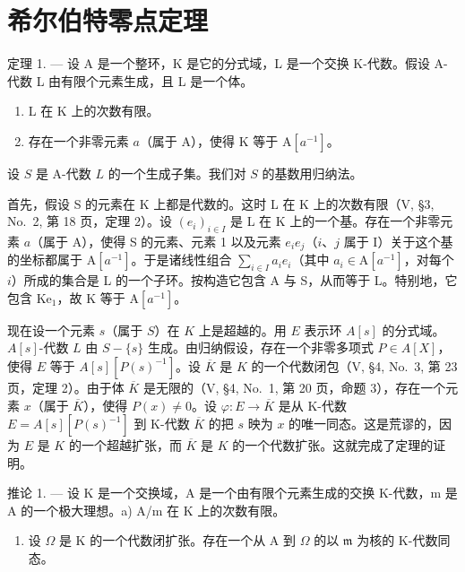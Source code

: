 \chapter{希尔伯特零点定理}

定理 1. --- 设 A 是一个整环，K 是它的分式域，L 是一个交换 K-代数。假设 A-代数 L 由有限个元素生成，且 L 是一个体。

\begin{enumerate}
\def\labelenumi{\alph{enumi})}
\item
  L 在 K 上的次数有限。
\item
  存在一个非零元素 \(a\)（属于 \(\mathrm{A}\)），使得 \(\mathrm{K}\) 等于 \(\mathrm{A}[a^{-1}]\)。
\end{enumerate}

设 \(S\) 是 A-代数 \(L\) 的一个生成子集。我们对 \(S\) 的基数用归纳法。

首先，假设 S 的元素在 K 上都是代数的。这时 L 在 K 上的次数有限（V, §3, No.~2, 第 18 页，定理 2）。设 \((e_i)_{i\in I}\) 是 L 在 K 上的一个基。存在一个非零元素 \(a\)（属于 A），使得 S 的元素、元素 1 以及元素 \(e_i e_j\)（\(i\)、\(j\) 属于 I）关于这个基的坐标都属于 \(\mathrm{A}[a^{-1}]\)。于是诸线性组合 \(\sum_{i\in I}a_i e_i\)（其中 \(a_i\in \mathrm{A}[a^{-1}]\)，对每个 \(i\)）所成的集合是 L 的一个子环。按构造它包含 A 与 S，从而等于 L。特别地，它包含 \(\mathrm{Ke}_1\)，故 K 等于 \(\mathrm{A}[a^{-1}]\)。

现在设一个元素 \(s\)（属于 \(S\)）在 \(K\) 上是超越的。用 \(E\) 表示环 \(A[s]\) 的分式域。\(A[s]\)-代数 \(L\) 由 \(S - \{s\}\) 生成。由归纳假设，存在一个非零多项式 \(P \in A[X]\)，使得 \(E\) 等于 \(A[s][P(s)^{-1}]\)。设 \(\overline{K}\) 是 \(K\) 的一个代数闭包（V, §4, No.~3, 第 23 页，定理 2）。由于体 \(\overline{K}\) 是无限的（V, §4, No.~1, 第 20 页，命题 3），存在一个元素 \(x\)（属于 \(\overline{K}\)），使得 \(P(x) \neq 0\)。设 \(\varphi : E \to \overline{K}\) 是从 K-代数 \(E = A[s][P(s)^{-1}]\) 到 K-代数 \(\overline{K}\) 的把 \(s\) 映为 \(x\) 的唯一同态。这是荒谬的，因为 \(E\) 是 \(K\) 的一个超越扩张，而 \(\overline{K}\) 是 \(K\) 的一个代数扩张。这就完成了定理的证明。

推论 1. --- 设 K 是一个交换域，A 是一个由有限个元素生成的交换 K-代数，m 是 A 的一个极大理想。a) A/m 在 K 上的次数有限。

\begin{enumerate}
\def\labelenumi{\alph{enumi})}
\setcounter{enumi}{1}
\tightlist
\item
  设 \(\Omega\) 是 K 的一个代数闭扩张。存在一个从 A 到 \(\Omega\) 的以 \(\mathfrak{m}\) 为核的 K-代数同态。
\end{enumerate}

